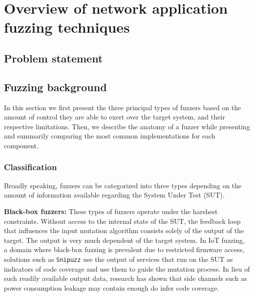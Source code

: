 \section{Overview of network application fuzzing techniques}
\label{extend:netfuzz}

\subsection{Problem statement}
\label{extend:netfuzz:intro}


\subsection{Fuzzing background}
\label{extend:netfuzz:background}

In this section we first present the three principal types of fuzzers based on the amount of control they are able to exert over the target system, and their respective limitations. Then, we describe the anatomy of a fuzzer while presenting and summarily comparing the most common implementations for each component.

\subsubsection{Classification}
\label{extend:netfuzz:classification}

Broadly speaking, fuzzers can be categorized into three types depending on the amount of information available regarding the System Under Test (SUT).

\textbf{Black-box fuzzers:} These types of fuzzers operate under the harshest constraints. Without access to the internal state of the SUT, the feedback loop that influences the input mutation algorithm consists solely of the output of the target. The output is very much dependent of the target system. In IoT fuzzing, a domain where black-box fuzzing is prevalent due to restricted firmware access, solutions such as \texttt{Snipuzz} \cite{feng2021snipuzz} use the output of services that run on the SUT as indicators of code coverage and use them to guide the mutation process. In lieu of such readily available output data, research has shown \cite{sperl2019side} that side channels such as power consumption leakage may contain enough do infer code coverage.

